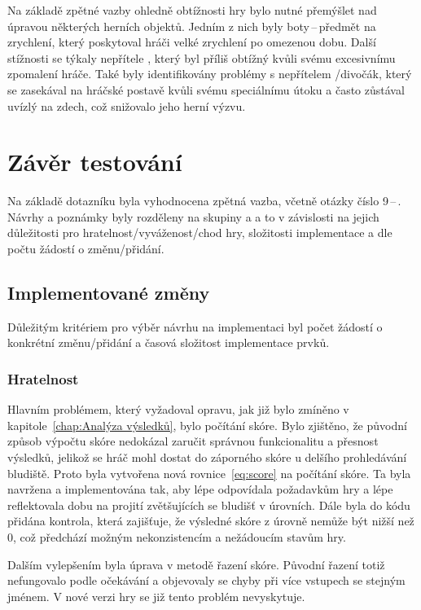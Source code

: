 Na základě zpětné vazby ohledně obtížnosti hry bylo nutné přemýšlet nad úpravou některých herních objektů. Jedním z nich byly boty\,--\,předmět na zrychlení, který poskytoval hráči velké zrychlení po omezenou dobu. Další stížnosti se týkaly nepřítele , který byl příliš obtížný kvůli svému excesivnímu zpomalení hráče. Také byly identifikovány problémy s nepřítelem /divočák, který se zasekával na hráčské postavě kvůli svému speciálnímu útoku a často zůstával uvízlý na zdech, což snižovalo jeho herní výzvu.

\section{Závěr testování}
Na základě dotazníku byla vyhodnocena zpětná vazba, včetně otázky číslo 9\,--\,. Návrhy a poznámky byly rozděleny na skupiny  a  a to v závislosti na jejich důležitosti pro hratelnost/vyváženost/chod hry, složitosti implementace a dle počtu žádostí o změnu/přidání.

\subsection*{Implementované změny}
Důležitým kritériem pro výběr návrhu na implementaci byl počet žádostí o konkrétní změnu/přidání a časová složitost implementace prvků.

\subsubsection*{\textbullet Hratelnost}
Hlavním problémem, který vyžadoval opravu, jak již bylo zmíněno v kapitole~\ref{chap:Analýza výsledků}, bylo počítání skóre. Bylo zjištěno, že původní způsob výpočtu skóre nedokázal zaručit správnou funkcionalitu a přesnost výsledků, jelikož se hráč mohl dostat do záporného skóre u delšího prohledávání bludiště. Proto byla vytvořena nová rovnice~\ref{eq:score} na počítání skóre. Ta byla navržena a implementována tak, aby lépe odpovídala požadavkům hry a lépe reflektovala dobu na projití zvětšujících se bludišť v úrovních. Dále byla do kódu přidána kontrola, která zajišťuje, že výsledné skóre z úrovně nemůže být nižší než 0, což předchází možným nekonzistencím a nežádoucím stavům hry.

Dalším vylepšením byla úprava v metodě řazení skóre. Původní řazení totiž nefungovalo podle očekávání a objevovaly se chyby při více vstupech se stejným jménem. V nové verzi hry se již tento problém nevyskytuje.

